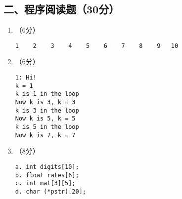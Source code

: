 \documentclass[8pt]{article}
\begin{document}
\begin{CJK}{UTF8}{gkai}
\subsection*{二、程序阅读题（30分）}
\begin{enumerate}
\item （6分）
\begin{lstlisting}[showspaces=true]
    1    2    3    4    5    6    7    8    9   10
\end{lstlisting}

\item （6分）
\begin{lstlisting} 
1: Hi!
k = 1
k is 1 in the loop
Now k is 3, k = 3
k is 3 in the loop
Now k is 5, k = 5
k is 5 in the loop
Now k is 7, k = 7
\end{lstlisting}

\item （8分）

\begin{lstlisting} 
a. int digits[10];
b. float rates[6];
c. int mat[3][5];
d. char (*pstr)[20];
\end{lstlisting}


\end{enumerate}
\end{CJK}
\end{document}
